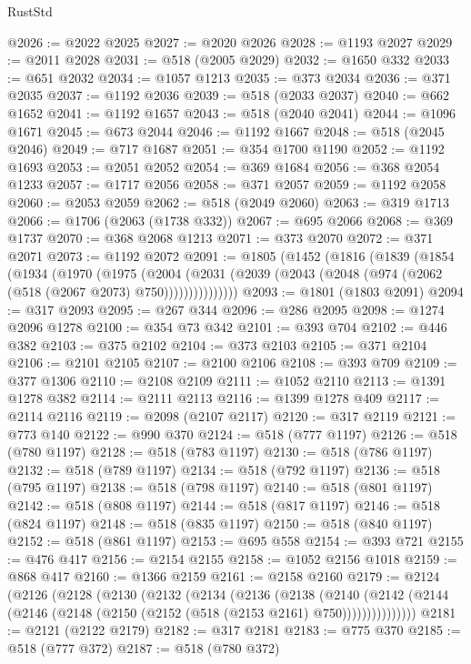\begin{lexlean}{RustStd}
\begin{coremodule}
@2026 := @2022 @2025
@2027 := @2020 @2026
@2028 := @1193 @2027
@2029 := @2011 @2028
@2031 := @518 (@2005 @2029)
@2032 := @1650 @332
@2033 := @651 @2032
@2034 := @1057 @1213
@2035 := @373 @2034
@2036 := @371 @2035
@2037 := @1192 @2036
@2039 := @518 (@2033 @2037)
@2040 := @662 @1652
@2041 := @1192 @1657
@2043 := @518 (@2040 @2041)
@2044 := @1096 @1671
@2045 := @673 @2044
@2046 := @1192 @1667
@2048 := @518 (@2045 @2046)
@2049 := @717 @1687
@2051 := @354 @1700 @1190
@2052 := @1192 @1693
@2053 := @2051 @2052
@2054 := @369 @1684
@2056 := @368 @2054 @1233
@2057 := @1717 @2056
@2058 := @371 @2057
@2059 := @1192 @2058
@2060 := @2053 @2059
@2062 := @518 (@2049 @2060)
@2063 := @319 @1713
@2066 := @1706 (@2063 (@1738 @332))
@2067 := @695 @2066
@2068 := @369 @1737
@2070 := @368 @2068 @1213
@2071 := @373 @2070
@2072 := @371 @2071
@2073 := @1192 @2072
@2091 := @1805
    (@1452
      (@1816
        (@1839
          (@1854
            (@1934
              (@1970
                (@1975
                  (@2004
                    (@2031 (@2039 (@2043 (@2048 (@974 (@2062 (@518 (@2067 @2073) @750)))))))))))))))
@2093 := @1801 (@1803 @2091)
@2094 := @317 @2093
@2095 := @267 @344
@2096 := @286 @2095
@2098 := @1274 @2096 @1278
@2100 := @354 @73 @342
@2101 := @393 @704
@2102 := @446 @382
@2103 := @375 @2102
@2104 := @373 @2103
@2105 := @371 @2104
@2106 := @2101 @2105
@2107 := @2100 @2106
@2108 := @393 @709
@2109 := @377 @1306
@2110 := @2108 @2109
@2111 := @1052 @2110
@2113 := @1391 @1278 @382
@2114 := @2111 @2113
@2116 := @1399 @1278 @409
@2117 := @2114 @2116
@2119 := @2098 (@2107 @2117)
@2120 := @317 @2119
@2121 := @773 @140
@2122 := @990 @370
@2124 := @518 (@777 @1197)
@2126 := @518 (@780 @1197)
@2128 := @518 (@783 @1197)
@2130 := @518 (@786 @1197)
@2132 := @518 (@789 @1197)
@2134 := @518 (@792 @1197)
@2136 := @518 (@795 @1197)
@2138 := @518 (@798 @1197)
@2140 := @518 (@801 @1197)
@2142 := @518 (@808 @1197)
@2144 := @518 (@817 @1197)
@2146 := @518 (@824 @1197)
@2148 := @518 (@835 @1197)
@2150 := @518 (@840 @1197)
@2152 := @518 (@861 @1197)
@2153 := @695 @558
@2154 := @393 @721
@2155 := @476 @417
@2156 := @2154 @2155
@2158 := @1052 @2156 @1018
@2159 := @868 @417
@2160 := @1366 @2159
@2161 := @2158 @2160
@2179 := @2124
    (@2126
      (@2128
        (@2130
          (@2132
            (@2134
              (@2136
                (@2138
                  (@2140
                    (@2142
                      (@2144 (@2146 (@2148 (@2150 (@2152 (@518 (@2153 @2161) @750)))))))))))))))
@2181 := @2121 (@2122 @2179)
@2182 := @317 @2181
@2183 := @775 @370
@2185 := @518 (@777 @372)
@2187 := @518 (@780 @372)

\end{coremodule}
\end{lexlean}
